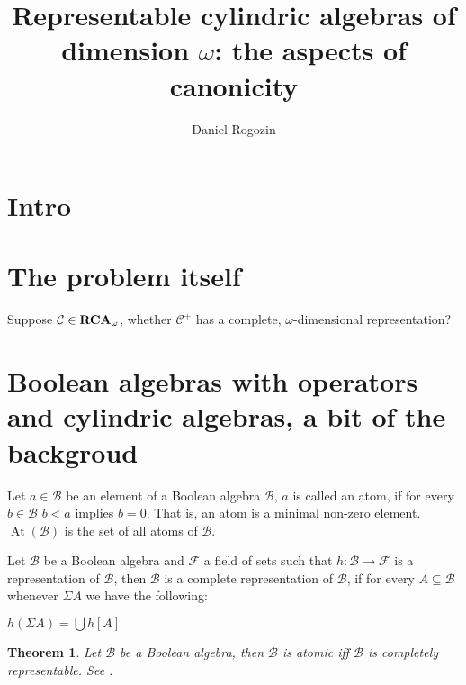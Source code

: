 \documentclass[a4paper]{article}
\author{Daniel Rogozin}
\date{}
\title{Representable cylindric algebras of dimension $\omega$: the aspects of canonicity}
\theoremstyle{defin}
\theoremstyle{theorem}
\newtheorem{theorem}{Theorem}
\theoremstyle{prop}
\theoremstyle{lemma}
\theoremstyle{fact}
\theoremstyle{ex}
\theoremstyle{col}
\begin{document}
\maketitle

\section{Intro}

\section{The problem itself}

Suppose $\mathcal{C} \in {\bf RCA}_{\omega}$, whether $\mathcal{C}^{+}$ has a complete, $\omega$-dimensional representation? \cite{hirsch2002relation}

\section{Boolean algebras with operators and cylindric algebras, a bit of the backgroud}

Let $a \in \mathcal{B}$ be an element of a Boolean algebra $\mathcal{B}$, $a$ is called an atom, if for every $b \in \mathcal{B}$
$b < a$ implies $b = 0$. That is, an atom is a minimal non-zero element. $\operatorname{At}(\mathcal{B})$ is the set of all atoms
of $\mathcal{B}$.

Let $\mathcal{B}$ be a Boolean algebra and $\mathcal{F}$ a field of sets such that $h : \mathcal{B} \to \mathcal{F}$ is a
representation of $\mathcal{B}$, then $\mathcal{B}$ is a complete representation of $\mathcal{B}$, if for every
$A \subseteq \mathcal{B}$ whenever $\Sigma A$ we have the following:
\begin{center}
  $h(\Sigma A) = \bigcup h[A]$
\end{center}

\begin{theorem} \label{completeboolean}
  Let $\mathcal{B}$ be a Boolean algebra, then $\mathcal{B}$ is atomic iff $\mathcal{B}$ is completely representable. See \cite[Corollary 6]{hirsch1997complete}.
\end{theorem}
\end{document}
